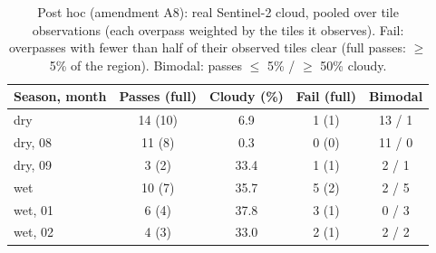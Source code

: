 \begin{table}[!t]
\centering
\footnotesize
\renewcommand{\arraystretch}{1.2}
\setlength{\tabcolsep}{3pt}
\caption{Post hoc (amendment A8): real Sentinel-2 cloud, pooled over tile observations (each overpass weighted by the tiles it observes). Fail: overpasses with fewer than half of their observed tiles clear (full passes: $\geq$ 5\% of the region). Bimodal: passes $\leq$ 5\% / $\geq$ 50\% cloudy.}
\label{tab:a8_pooled}
\begin{tabular}{|l|c|c|c|c|}
\hline
Season, month & Passes (full) & Cloudy (\%) & Fail (full) & Bimodal \\
\hline
dry & 14 (10) & 6.9 & 1 (1) & 13 / 1 \\
\hline
dry, 08 & 11 (8) & 0.3 & 0 (0) & 11 / 0 \\
\hline
dry, 09 & 3 (2) & 33.4 & 1 (1) & 2 / 1 \\
\hline
wet & 10 (7) & 35.7 & 5 (2) & 2 / 5 \\
\hline
wet, 01 & 6 (4) & 37.8 & 3 (1) & 0 / 3 \\
\hline
wet, 02 & 4 (3) & 33.0 & 2 (1) & 2 / 2 \\
\hline
\end{tabular}
\end{table}
